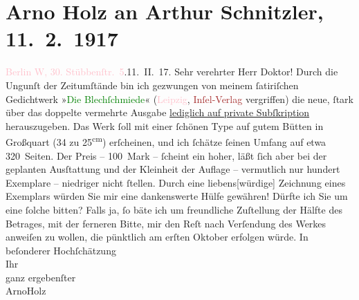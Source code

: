 

               \section[Arno Holz an Arthur Schnitzler, 11. 2. 1917]{ Arno Holz an Arthur Schnitzler, 11. 2. 1917}\nopagebreak{}\rehead{ }\normalsize\beginnumbering{} \toendnotes[C]{\smallbreak\pagebreak[2]} 
\pstart
           \raggedleft{}{\pb}\textcolor{pink}{Berlin W, 30. Stübbenſtr. 5}{}\ledrightnote{\textcolor{pink}{Stübbenstraße}}.\hspace*{1.5em}11. II. 17. \pend
           \pstart\center{}Sehr verehrter Herr Doktor!\pend\pstart
           Durch die Ungunſt der Zeitumſtände bin ich gezwungen von meinem ſatiriſchen
                    Gedichtwerk »\textcolor{green}{Die Blechſchmiede}{}\ledrightnote{\textcolor{green}{Die Blechschmiede}}« (\textcolor{pink}{Leipzig}{}\ledrightnote{\textcolor{pink}{Leipzig}}, \textcolor{brown}{Inſel-Verlag}{}\ledrightnote{\textcolor{brown}{Insel-Verlag}} vergriffen) die neue, ſtark über das doppelte vermehrte
                    Ausgabe \uline{lediglich auf private Subſkription}
                    herauszugeben. Das Werk ſoll mit einer ſchönen Type auf gutem Bütten in
                    Großquart (34 zu 25\textsuperscript{cm}) erſcheinen, und ich ſchätze
                    ſeinen Umfang auf etwa 320 Seiten. Der Preis – 100 Mark – ſcheint ein hoher,
                    läßt ſich aber bei der geplanten Ausſtattung und der Kleinheit der Auflage –
                    vermutlich nur hundert Exemplare – niedriger nicht ſtellen. Durch eine
                        liebens{[}würdige{]} Zeichnung eines Exemplars würden Sie mir
                    eine dankenswerte Hülfe gewähren! Dürfte ich Sie um eine ſolche bitten? Falls
                    ja, ſo bäte ich um freundliche Zuſtellung der Hälfte des Betrages, mit der
                    ferneren Bitte, mir den Reſt nach Verſendung des Werkes anweiſen zu wollen, die
                    pünktlich am erſten Oktober erfolgen würde.\pend
           \pstart
           In beſonderer Hochſchätzung{\\[\baselineskip]}Ihr{\\[\baselineskip]}ganz ergebenſter{\\[\baselineskip]}\spacefill\mbox{ArnoHolz}\pend
